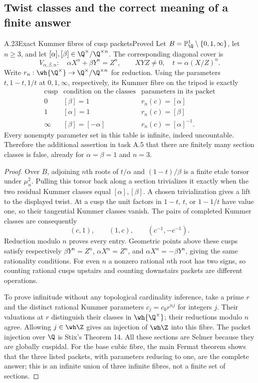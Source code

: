 \subsection{Twist classes and the correct meaning of a finite answer}

\begin{statement}{A.23}{Exact Kummer fibres of cusp packets}{Proved}
Let $B=\mathbb P^1_\Q\setminus\{0,1,\infty\}$, let $n\ge3$, and let $[\alpha],[\beta]\in\Q^\times/\Q^{\times n}$. The corresponding diagonal cover is
\[
V_{\alpha,\beta,n}:\quad \alpha X^n+\beta Y^n=Z^n,\qquad XYZ\ne0,
\quad t=\alpha(X/Z)^n.
\]
Write $r_n:\wh{\Q^\times}\to\Q^\times/\Q^{\times n}$ for reduction. Using the parameters $t,1-t,1/t$ at $0,1,\infty$, respectively, its Kummer fibre on the tripod is exactly
\[
\begin{array}{c|c|c}
\text{cusp}&\text{condition on the classes}&\text{parameters in its packet}\\\hline
0&[\beta]=1&r_n(c)=[\alpha]\\
1&[\alpha]=1&r_n(c)=[\beta]\\
\infty&[\beta]=[-\alpha]&r_n(c)=[\alpha]^{-1}.
\end{array}
\]
Every nonempty parameter set in this table is infinite, indeed uncountable. Therefore the additional assertion in task A.5 that there are finitely many section classes is false, already for $\alpha=\beta=1$ and $n=3$.
\end{statement}
\begin{proof}
Over $B$, adjoining $n$th roots of $t/\alpha$ and $(1-t)/\beta$ is a finite etale torsor under $\mu_n^2$. Pulling this torsor back along a section trivializes it exactly when the two residual Kummer classes equal $[\alpha],[\beta]$. A chosen trivialization gives a lift to the displayed twist. At a cusp the unit factors in $1-t$, $t$, or $1-1/t$ have value one, so their tangential Kummer classes vanish. The pairs of completed Kummer classes are consequently
\[
(c,1),\qquad (1,c),\qquad(c^{-1},-c^{-1}).
\]
Reduction modulo $n$ proves every entry. Geometric points above these cusps satisfy respectively $\beta Y^n=Z^n$, $\alpha X^n=Z^n$, and $\alpha X^n=-\beta Y^n$, giving the same rationality conditions. For even $n$ a nonzero rational $n$th root has two signs, so counting rational cusps upstairs and counting downstairs packets are different operations.

To prove infinitude without any topological cardinality inference, take a prime $r$ and the distinct rational Kummer parameters $c_j=c_0r^{nj}$ for integers $j$. Their valuations at $r$ distinguish their classes in $\wh{\Q^\times}$; their reductions modulo $n$ agree. Allowing $j\in\wh\Z$ gives an injection of $\wh\Z$ into this fibre. The packet injection over $\Q$ is Stix's Theorem 14. All these sections are Selmer because they are globally cuspidal. For the base cubic fibre, the main Fermat theorem shows that the three listed packets, with parameters reducing to one, are the complete answer; this is an infinite union of three infinite fibres, not a finite set of sections.
\end{proof}

